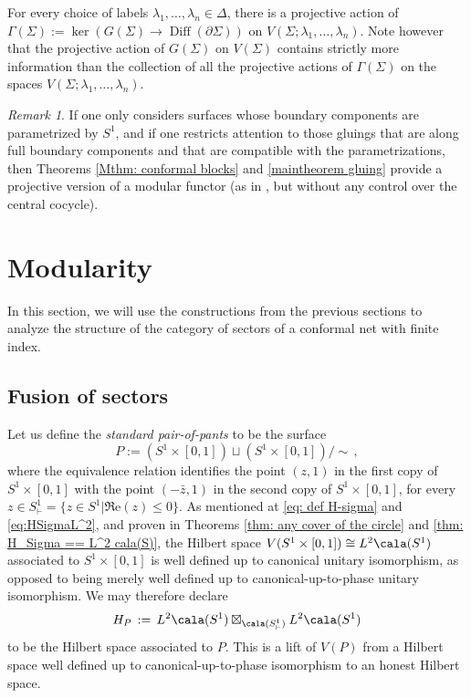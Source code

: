 \documentclass[a4paper,10pt,leqno]{amsart}
\theoremstyle{plain}
\theoremstyle{definition}
\theoremstyle{remark}
\newtheorem{remark}[theorem]{Remark}
\DeclareMathOperator{\Diff}{Diff}
\begin{document}
For every choice of labels $\lambda_1,\ldots,\lambda_n\in\Delta$, there is a projective action of $\Gamma(\Sigma):=\ker(G(\Sigma)\to\Diff(\partial\Sigma))$ on $V(\Sigma;\lambda_1,\ldots,\lambda_n)$.
Note however that the projective action of $G(\Sigma)$ on $V(\Sigma)$ contains strictly more information than the collection of all the projective actions of $\Gamma(\Sigma)$ on the spaces $V(\Sigma;\lambda_1,\ldots,\lambda_n)$.

\begin{remark}\label{rmk: modular functor}
If one only considers surfaces whose boundary components
are parametrized by $S^1$, and if one restricts attention to those gluings that are along full boundary components and that are compatible with the parametrizations,
then Theorems \ref{Mthm: conformal blocks} and \ref{maintheorem gluing}
provide a projective version of a modular functor (as in \cite[Def.~5.7.10]{Bakalov-Kirillov(Lect-tens-cat+mod-func)}, but without any control over the central cocycle).
\end{remark}



\section{Modularity}
\label{sec:modularity}

In this section, we will use the constructions from the previous sections to analyze the structure of the category of sectors of a conformal net with finite index.

\subsection{Fusion of sectors}
Let us define the \emph{standard pair-of-pants} to be the surface
\[
P:=(S^1\times[0,1])\sqcup(S^1\times[0,1])/\sim\,,
\]
where the equivalence relation identifies the point $(z,1)$ in the first copy of $S^1\times[0,1]$
with the point $(-\bar z,1)$ in the second copy of $S^1\times[0,1]$, for every $z\in S^1_\vdash =\{z\in S^1| \Re\mathrm{e}(z)\le 0\}$.
As mentioned at \eqref{eq: def H-sigma} and \eqref{eq:HSigmaL^2}, and proven in Theorems \ref{thm: any cover of the circle} and \ref{thm: H_Sigma == L^2 cala(S)},
the Hilbert space $V(S^1\times[0,1]) \cong L^2\cala(S^1)$ associated to $S^1\times[0,1]$ is well defined up to canonical unitary isomorphism, as opposed to being merely 
well defined up to canonical-up-to-phase unitary isomorphism.
We may therefore declare
\begin{equation}\label{eq: def: H_P}
H_P\,:=\,L^2\cala(S^1)\boxtimes_{\cala(S^1_{\vdash})}L^2\cala(S^1)
\end{equation}
to be the Hilbert space associated to $P$.
This is a lift of $V(P)$ from a Hilbert space well defined up to canonical-up-to-phase isomorphism to an honest Hilbert space.
\end{document}
